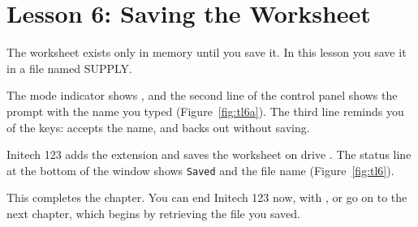 \section{Lesson 6: Saving the Worksheet}
The worksheet exists only in memory until you save it.  In this lesson you
save it in a file named SUPPLY.

\begin{Keystrokes}
\end{Keystrokes}
The mode indicator shows , and the second line of the control
panel shows the prompt with the name you typed (Figure~\ref{fig:tl6a}).
The third line reminds you of the keys:  accepts the name, and
 backs out without saving.
\begin{Keystrokes}
\end{Keystrokes}
Initech 123 adds the extension  and saves the worksheet on drive
.  The status line at the bottom of the window shows
\texttt{Saved} and the file name (Figure~\ref{fig:tl6}).

This completes the chapter.  You can end Initech 123 now, with
, or go on to the next chapter, which begins by
retrieving the file you saved.
